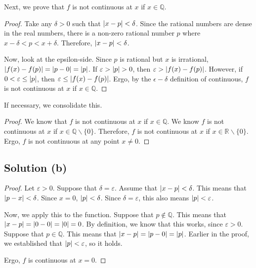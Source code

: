 \documentclass[11pt]{article}
\begin{document}
        Next, we prove that $f$ is not continuous at $x$ if $x \in \mathbb{Q}$.
        \begin{proof}
            Take any $\delta > 0$ such that $\left| x - p \right| < \delta$.
            Since the rational numbers are dense in the real numbers, there is a non-zero rational number $p$ where $x - \delta < p < x + \delta$.
            Therefore, $\left| x - p \right| < \delta$.

            Now, look at the epsilon-side.
            Since $p$ is rational but $x$ is irrational, $\left| f(x) - f(p) \right| = \left| p - 0 \right| = \left| p \right|$.
            If $\varepsilon > \left| p \right| > 0$, then $\varepsilon > \left| f(x) - f(p) \right|$.
            However, if $0 < \varepsilon \leq \left| p \right|$, then $\varepsilon \leq \left| f(x) - f(p) \right|$.
            Ergo, by the $\epsilon-\delta$ definition of continuous, $f$ is not continuous at $x$ if $x \in \mathbb{Q}$.
        \end{proof}

        If necessary, we consolidate this.
        \begin{proof}
            We know that $f$ is not continuous at $x$ if $x \in \mathbb{Q}$.
            We know $f$ is not continuous at $x$ if $x \in \mathbb{Q} \backslash \{0\}$.
            Therefore, $f$ is not continuous at $x$ if $x \in \mathbb{R} \backslash \{0\}$.
            Ergo, $f$ is not continuous at any point $x \neq 0$.
        \end{proof}

    \subsection{Solution (b)}
        \begin{proof}
            Let $\varepsilon > 0$.
            Suppose that $\delta = \varepsilon$.
            Assume that $\left| x - p \right| < \delta$.
            This means that $\left| p - x \right| < \delta$.
            Since $x = 0$, $\left| p \right| < \delta$.
            Since  $\delta = \varepsilon$, this also means $\left| p \right| < \varepsilon$.

            Now, we apply this to the function.
            Suppose that $p \notin \mathbb{Q}$.
            This means that $\left| x - p \right| = \left| 0 - 0 \right| = \left| 0 \right| = 0$.
            By definition, we know that this works, since $\varepsilon > 0$.
            Suppose that $p \in \mathbb{Q}$.
            This means that $\left| x - p \right| = \left| p - 0 \right| = \left| p \right|$.
            Earlier in the proof, we established that $\left| p \right| < \varepsilon$, so it holds.

            Ergo, $f$ is continuous at $x = 0$.
        \end{proof}
\end{document}
